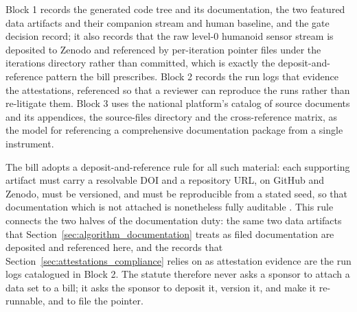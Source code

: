 Block 1 records the generated code tree and its documentation, the two featured
data artifacts and their companion stream and human baseline, and the gate
decision record; it also records that the raw level-0 humanoid sensor stream is
deposited to Zenodo and referenced by per-iteration pointer files under the
iterations directory rather than committed, which is exactly the
deposit-and-reference pattern the bill prescribes. Block 2 records the run logs
that evidence the attestations, referenced so that a reviewer can reproduce the
runs rather than re-litigate them. Block 3 uses the national platform's catalog of
source documents and its appendices, the source-files directory and the
cross-reference matrix, as the model for referencing a comprehensive
documentation package from a single instrument.

The bill adopts a deposit-and-reference rule for all such material: each
supporting artifact must carry a resolvable DOI and a repository URL, on GitHub
and Zenodo, must be versioned, and must be reproducible from a stated seed, so
that documentation which is not attached is nonetheless fully auditable
\cite{zenodo}. This rule connects the two halves of the documentation duty: the
same two data artifacts that Section~\ref{sec:algorithm_documentation} treats as
filed documentation are deposited and referenced here, and the records that
Section~\ref{sec:attestations_compliance} relies on as attestation evidence are
the run logs catalogued in Block 2. The statute therefore never asks a sponsor to
attach a data set to a bill; it asks the sponsor to deposit it, version it, and
make it re-runnable, and to file the pointer.

\newpage

